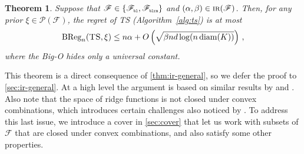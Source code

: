 \documentclass[letter, 12pt]{report}
\newcommand{\pr}{\text{\tiny\texttt{r}}}
\newcommand{\pb}{\text{\tiny\texttt{b}}}
\newcommand{\pl}{\text{\tiny\texttt{l}}}
\renewcommand{\pm}{\text{\tiny\texttt{m}}}
\newcommand{\BReg}{\textrm{BReg}}
\newcommand{\sF}{\mathscr F}
\newcommand{\sP}{\mathscr P}
\newcommand{\diam}{\operatorname{diam}}
\newcommand{\1}{\mathbf{1}}
\newcommand{\IR}{\operatorname{\textsc{ir}}}
\newcommand{\ts}{\textsc{TS}\xspace}
\theoremstyle{plain}
\newtheorem{theorem}{Theorem}
\theoremstyle{definition}
\theoremstyle{remark}
\begin{document}
\begin{theorem}\label{thm:ts-ir-regret}
    Suppose that $\sF \in \{\sF_{\pb\pl}, \sF_{\pb\pl\pr\pm}\}$ and $(\alpha, \beta) \in \IR(\sF)$.
    Then, for any prior $\xi \in \sP(\sF)$, the regret of \ts{} (Algorithm~\ref{alg:ts}) is at most
    \begin{align*}
        \BReg_n(\ts, \xi) \leq n \alpha + O\left(\sqrt{\beta n d \log(n \diam(K))}\right) \,,
    \end{align*}
    where the Big-O hides only a universal constant.
\end{theorem}
This theorem is a direct consequence of \cref{thm:ir-general},
so we defer the proof to \cref{sec:ir-general}.
At a high level the argument is based on similar results by \cite{BDKP15} and \cite{BE18}.
Also note that the space of ridge functions is not closed under convex combinations, which introduces certain challenges also
noticed by \cite{lattimore2021minimax}.
To address this last issue, we introduce a cover in \cref{sec:cover} that let us
work with subsets of $\sF$ that are closed under convex combinations,
and also satisfy some other properties.
\end{document}
